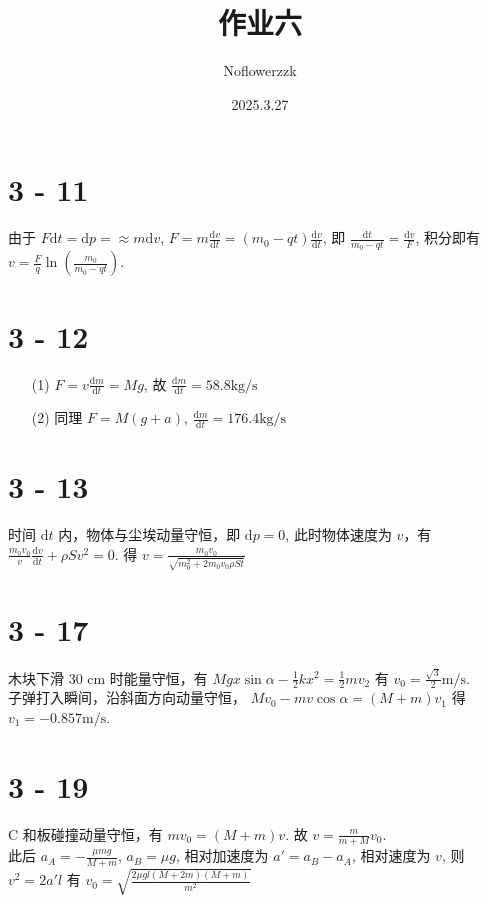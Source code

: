 \documentclass{article}
\title{作业六}
\author{Noflowerzzk}
\date{2025.3.27}
\newcommand{\dd}{\mathrm{d}}
\begin{document}
\maketitle

\section*{3 - 11}

由于 $F \dd t = \dd p = \approx m \dd v$, $F = m \frac{\dd v}{\dd t} = (m_0 - qt)\frac{\dd v}{\dd t}$, 即 $\frac{\dd t}{m_0 - qt} = \frac{\dd v}{F}$, 积分即有 $v = \frac{F}{q}\ln \left(\frac{m_0}{m_0 - qt}\right)$.

\section*{3 - 12}

\begin{itemize}
    \item [(1)] $F = v \frac{\dd m}{\dd t} = Mg$, 故 $\frac{\dd m}{\dd t} = 58.8 \mathrm{kg/s}$
    \item [(2)] 同理 $F = M(g + a)$, $\frac{\dd m}{\dd t} = 176.4 \mathrm{kg/s}$
\end{itemize}

\section*{3 - 13}

时间 $\dd t$ 内，物体与尘埃动量守恒，即 $\dd p = 0$, 此时物体速度为 $v$，有 $\frac{m_0v_0}{v}\frac{\dd v}{\dd t} + \rho S v^2 = 0$. 得 $v = \frac{m_0v_0}{\sqrt{m_0^2 + 2m_0v_0\rho S t}}$

\section*{3 - 17}

木块下滑 30 cm 时能量守恒，有 $Mgx\sin \alpha - \frac{1}{2}kx^2 = \frac{1}{2}mv_2$ 有 $v_0 = \frac{\sqrt{3}}{2} \mathrm{m/s}$. \\
子弹打入瞬间，沿斜面方向动量守恒， $Mv_0 - mv\cos \alpha = (M + m)v_1$ 得 $v_1 = -0.857 \mathrm{m/s}$.

\section*{3 - 19}

C 和板碰撞动量守恒，有 $mv_0 = (M + m)v$. 故 $v = \frac{m}{m + M}v_0$. \\
此后 $a_A = -\frac{\mu mg}{M + m}$, $a_B = \mu g$, 相对加速度为 $a' = a_B - a_A$, 相对速度为 $v$, 则 $v^2 = 2a'l$ 有 $v_0 = \sqrt{\frac{2\mu g l(M + 2m)(M + m)}{m^2}}$
\end{document}
